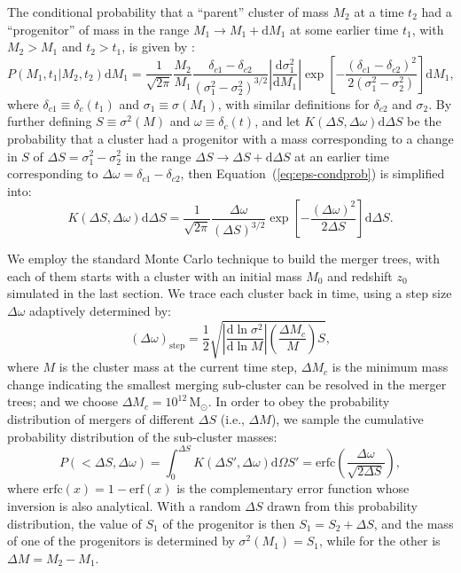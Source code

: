 \documentclass[modern]{aastex61}
\newcommand{\D}[1]{\mathrm{d} #1}
\newcommand{\diff}[2]{\frac{\D{#1}}{\D{#2}}}
\newcommand{\Msun}{\mathrm{M}_{\odot}}
\begin{document}
The conditional probability that a ``parent'' cluster of mass $M_2$ at
a time $t_2$ had a ``progenitor'' of mass in the range
$M_1 \rightarrow M_1 + \D{M_1}$ at some earlier time $t_1$,
with $M_2 > M_1$ and $t_2 > t_1$, is given by
\citep{lacey1993,randall2002}:
\begin{equation}
  \label{eq:eps-condprob}
  P(M_1, t_1 | M_2, t_2) \D{M_1} = \frac{1}{\sqrt{2\pi}} \frac{M_2}{M_1}
  \frac{\delta_{c1} - \delta_{c2}}{(\sigma_1^2 - \sigma_2^2)^{3/2}}
  \left| \diff{\sigma_1^2}{M_1} \right|
  \exp \left[ -\frac{(\delta_{c1} - \delta_{c2})^2}
    {2(\sigma_1^2 - \sigma_2^2)} \right] \D{M_1},
\end{equation}
where
$\delta_{c1} \equiv \delta_c(t_1)$ and $\sigma_1 \equiv \sigma(M_1)$,
with similar definitions for $\delta_{c2}$ and $\sigma_2$.
By further defining $S \equiv \sigma^2(M)$ and $\omega \equiv \delta_c(t)$,
and let $K(\Delta S, \Delta \omega) \D{\Delta S}$ be the probability
that a cluster had a progenitor with a mass corresponding to a change
in $S$ of $\Delta S = \sigma_1^2 - \sigma_2^2$ in the range
$\Delta S \rightarrow \Delta S + \D{\Delta S}$ at an earlier time
corresponding to $\Delta \omega = \delta_{c1} - \delta_{c2}$,
then Equation~(\ref{eq:eps-condprob}) is simplified into:
\begin{equation}
  \label{eq:eps-condprob-simp}
  K(\Delta S, \Delta \omega) \D{\Delta S} = \frac{1}{\sqrt{2\pi}}
  \frac{\Delta\omega}{(\Delta S)^{3/2}}
  \exp \left[ -\frac{(\Delta\omega)^2}{2 \Delta S} \right] \D{\Delta S}.
\end{equation}

We employ the standard Monte Carlo technique to build the merger trees,
with each of them starts with a cluster with an initial mass $M_0$
and redshift $z_0$ simulated in the last section.
We trace each cluster back in time, using a step size $\Delta\omega$
adaptively determined by:
\begin{equation}
  \label{sec:dw-step}
  (\Delta\omega)_{\mathrm{step}} = \frac{1}{2} \sqrt{
    \left| \diff{\ln \sigma^2}{\ln M} \right|
    \left( \frac{\Delta M_c}{M} \right) S},
\end{equation}
where $M$ is the cluster mass at the current time step,
$\Delta M_c$ is the minimum mass change indicating the smallest
merging sub-cluster can be resolved in the merger trees;
and we choose $\Delta M_c = 10^{12} \,\Msun$.
In order to obey the probability distribution of mergers of different
$\Delta S$ (i.e., $\Delta M$), we sample the cumulative probability
distribution of the sub-cluster masses:
\begin{equation}
  \label{sec:cdf-sub-masses}
  P(<\Delta S, \Delta\omega) =
  \int_0^{\Delta S} K(\Delta S', \Delta\omega) \D{\Omega S'} =
  \mathrm{erfc} \left( \frac{\Delta \omega}{\sqrt{2 \Delta S}} \right),
\end{equation}
where $\mathrm{erfc}(x) = 1 - \mathrm{erf}(x)$ is the complementary error
function whose inversion is also analytical.
With a random $\Delta S$ drawn from this probability distribution,
the value of $S_1$ of the progenitor is then $S_1 = S_2 + \Delta S$,
and the mass of one of the progenitors is determined by
$\sigma^2(M_1) = S_1$, while for the other is $\Delta M = M_2 - M_1$.
\end{document}
